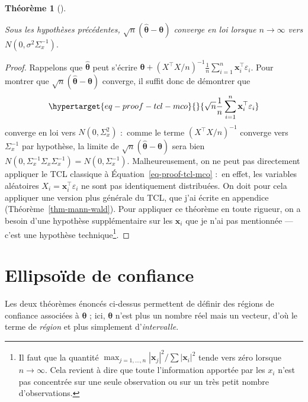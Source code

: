 \documentclass[
  10,
  letterpaper,
  DIV=11,
  numbers=noendperiod]{scrreport}
\newcommand{\bx}{\mathbf{x}}
\newcommand{\bt}{\boldsymbol{\theta}}
\theoremstyle{plain}
\newtheorem{theorem}{Théorème}[chapter]
\theoremstyle{definition}
\theoremstyle{plain}
\theoremstyle{definition}
\theoremstyle{definition}
\theoremstyle{plain}
\theoremstyle{remark}
\begin{document}
\begin{theorem}[]\protect\hypertarget{thm-mco-an}{}\label{thm-mco-an}

Sous les hypothèses précédentes, \(\sqrt{n}(\hat{\bt} - \bt)\) converge
en loi lorsque \(n\to\infty\) vers \(N(0,\sigma^2\Sigma_x^{-1}).\)

\end{theorem}

\begin{proof}

Rappelons que \(\hat{\bt}\) peut s'écrire
\(\bt + (X^\top X/n)^{-1}\frac{1}{n}\sum_{i=1}^n \bx_i^\top \varepsilon_i\).
Pour montrer que \(\sqrt{n}(\hat{\bt}-\bt)\) converge, il suffit donc de
démontrer que
\begin{equation}\protect\hypertarget{eq-proof-tcl-mco}{}{\sqrt{n}\frac{1}{n}\sum_{i=1}^n \bx_i^\top \varepsilon_i }\label{eq-proof-tcl-mco}\end{equation}
converge en loi vers \(N(0,\Sigma_x^2)\) :~comme le terme
\((X^\top X/n)^{-1}\) converge vers \(\Sigma_x^{-1}\) par hypothèse, la
limite de \(\sqrt{n}(\hat{\bt} - \bt)\) sera bien
\(N(0,\Sigma_x^{-1}\Sigma_x\Sigma_x^{-1}) = N(0,\Sigma_x^{-1})\).
Malheureusement, on ne peut pas directement appliquer le TCL classique à
Équation~\ref{eq-proof-tcl-mco} :~en effet, les variables aléatoires
\(X_i = \bx_i^\top \varepsilon_i\) ne sont pas identiquement
distribuées. On doit pour cela appliquer une version plus générale du
TCL, que j'ai écrite en appendice (Théorème~\ref{thm-mann-wald}). Pour
appliquer ce théorème en toute rigueur, on a besoin d'une hypothèse
supplémentaire sur les \(\bx_i\) que je n'ai pas mentionnée --- c'est
une hypothèse technique\footnote{Il faut que la quantité
  \(\max_{j=1, \dotsc, n}|\bx_j|^2 / \sum |\bx_i|^2\) tende vers zéro
  lorsque \(n\to\infty\). Cela revient à dire que toute l'information
  apportée par les \(x_i\) n'est pas concentrée sur une seule
  observation ou sur un très petit nombre d'observations.}.

\end{proof}

\hypertarget{ellipsouxefde-de-confiance}{%
\section{Ellipsoïde de confiance}\label{ellipsouxefde-de-confiance}}

Les deux théorèmes énoncés ci-dessus permettent de définir des régions
de confiance associées à \(\bt\) ; ici, \(\bt\) n'est plus un nombre
réel mais un vecteur, d'où le terme de \emph{région} et plus simplement
d'\emph{intervalle}.
\end{document}

